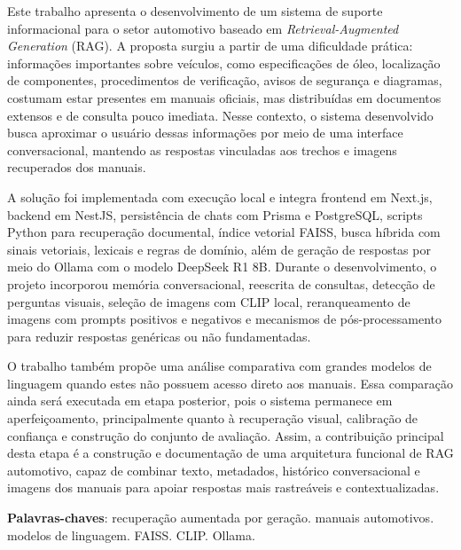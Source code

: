 \setlength{\absparsep}{18pt}

\begin{resumo}
Este trabalho apresenta o desenvolvimento de um sistema de suporte informacional para o setor automotivo baseado em \textit{Retrieval-Augmented Generation} (RAG). A proposta surgiu a partir de uma dificuldade prática: informações importantes sobre veículos, como especificações de óleo, localização de componentes, procedimentos de verificação, avisos de segurança e diagramas, costumam estar presentes em manuais oficiais, mas distribuídas em documentos extensos e de consulta pouco imediata. Nesse contexto, o sistema desenvolvido busca aproximar o usuário dessas informações por meio de uma interface conversacional, mantendo as respostas vinculadas aos trechos e imagens recuperados dos manuais.

A solução foi implementada com execução local e integra frontend em Next.js, backend em NestJS, persistência de chats com Prisma e PostgreSQL, scripts Python para recuperação documental, índice vetorial FAISS, busca híbrida com sinais vetoriais, lexicais e regras de domínio, além de geração de respostas por meio do Ollama com o modelo DeepSeek R1 8B. Durante o desenvolvimento, o projeto incorporou memória conversacional, reescrita de consultas, detecção de perguntas visuais, seleção de imagens com CLIP local, reranqueamento de imagens com prompts positivos e negativos e mecanismos de pós-processamento para reduzir respostas genéricas ou não fundamentadas.

O trabalho também propõe uma análise comparativa com grandes modelos de linguagem quando estes não possuem acesso direto aos manuais. Essa comparação ainda será executada em etapa posterior, pois o sistema permanece em aperfeiçoamento, principalmente quanto à recuperação visual, calibração de confiança e construção do conjunto de avaliação. Assim, a contribuição principal desta etapa é a construção e documentação de uma arquitetura funcional de RAG automotivo, capaz de combinar texto, metadados, histórico conversacional e imagens dos manuais para apoiar respostas mais rastreáveis e contextualizadas.

\textbf{Palavras-chaves}: recuperação aumentada por geração. manuais automotivos. modelos de linguagem. FAISS. CLIP. Ollama.
\end{resumo}
